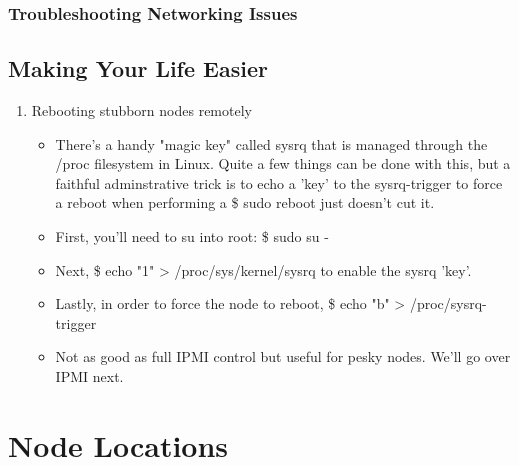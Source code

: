 \documentclass[10pt,letterpaper]{article}
\begin{document}
        \subsubsection{Troubleshooting Networking Issues}
    \subsection{Making Your Life Easier}
    \begin{enumerate}
        \item Rebooting stubborn nodes remotely
            \begin{itemize}
                \item There's a handy "magic key" called sysrq that is managed through the /proc filesystem in Linux. Quite a few things can be done with this, but a faithful adminstrative trick is to echo a 'key' to the sysrq-trigger to force a reboot when performing a {\selectfont \$ sudo reboot } just doesn't cut it.
                \item First, you'll need to su into root: {\selectfont \$ sudo su - }
                \item Next, {\selectfont \$ echo "1" > /proc/sys/kernel/sysrq } to enable the sysrq 'key'.
                 \item Lastly, in order to force the node to reboot, {\selectfont \$ echo "b" > /proc/sysrq-trigger }
                \item Not as good as full IPMI control but useful for pesky nodes. We'll go over IPMI next.
             \end{itemize}
    \end{enumerate}


\clearpage


\appendix
\section{Node Locations}
\end{document}
